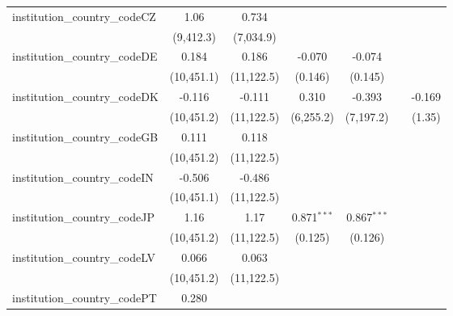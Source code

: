 \begin{tabular}{lcccccc}
   institution\_country\_codeCZ          & 1.06           & 0.734          &               &               &               &   \\   
                                         & (9,412.3)      & (7,034.9)      &               &               &               &   \\   
   institution\_country\_codeDE          & 0.184          & 0.186          & -0.070        & -0.074        &               &   \\   
                                         & (10,451.1)     & (11,122.5)     & (0.146)       & (0.145)       &               &   \\   
   institution\_country\_codeDK          & -0.116         & -0.111         & 0.310         & -0.393        &               & -0.169\\   
                                         & (10,451.2)     & (11,122.5)     & (6,255.2)     & (7,197.2)     &               & (1.35)\\   
   institution\_country\_codeGB          & 0.111          & 0.118          &               &               &               &   \\   
                                         & (10,451.2)     & (11,122.5)     &               &               &               &   \\   
   institution\_country\_codeIN          & -0.506         & -0.486         &               &               &               &   \\   
                                         & (10,451.1)     & (11,122.5)     &               &               &               &   \\   
   institution\_country\_codeJP          & 1.16           & 1.17           & 0.871$^{***}$ & 0.867$^{***}$ &               &   \\   
                                         & (10,451.2)     & (11,122.5)     & (0.125)       & (0.126)       &               &   \\   
   institution\_country\_codeLV          & 0.066          & 0.063          &               &               &               &   \\   
                                         & (10,451.2)     & (11,122.5)     &               &               &               &   \\   
   institution\_country\_codePT          & 0.280          &                &               &               &               &   \\   

\end{tabular}
